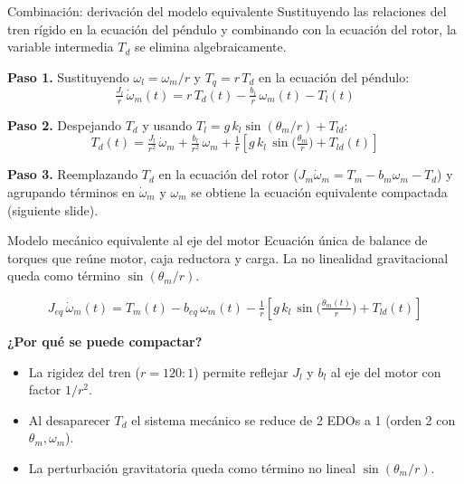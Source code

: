 \documentclass[aspectratio=169,t]{beamer}
\begin{document}
\begin{frame}{Combinación: derivación del modelo equivalente}
{\small\color{uncGray}Sustituyendo las relaciones del tren rígido en la ecuación del péndulo y combinando con la ecuación del rotor, la variable intermedia $T_d$ se elimina algebraicamente.}\par
\vspace{2mm}

\textbf{Paso 1.} Sustituyendo $\omega_l = \omega_m/r$ y $T_q = r\,T_d$ en la ecuación del péndulo:
\begin{equation*}
\tfrac{J_l}{r}\,\dot{\omega}_m(t) = r\,T_d(t) - \tfrac{b_l}{r}\,\omega_m(t) - T_l(t)
\end{equation*}

\textbf{Paso 2.} Despejando $T_d$ y usando $T_l = g\,k_l\sin(\theta_m/r)+T_{ld}$:
\begin{equation*}
T_d(t) = \tfrac{J_l}{r^2}\,\dot{\omega}_m + \tfrac{b_l}{r^2}\,\omega_m + \tfrac{1}{r}\!\left[g\,k_l\,\sin\!\big(\tfrac{\theta_m}{r}\big) + T_{ld}(t)\right]
\end{equation*}

\textbf{Paso 3.} Reemplazando $T_d$ en la ecuación del rotor ($J_m\dot{\omega}_m=T_m-b_m\omega_m-T_d$) y agrupando términos en $\dot{\omega}_m$ y $\omega_m$ se obtiene la ecuación equivalente compactada (siguiente slide).
\end{frame}

\begin{frame}{Modelo mecánico equivalente al eje del motor}
{\small\color{uncGray}Ecuación única de balance de torques que reúne motor, caja reductora y carga. La no linealidad gravitacional queda como término $\sin(\theta_m/r)$.}\par
\vspace{8mm}

\begin{equation*}
\boxed{\;\;
J_{eq}\,\dot{\omega}_m(t) = T_m(t) - b_{eq}\,\omega_m(t) - \tfrac{1}{r}\!\left[g\,k_l\,\sin\!\big(\tfrac{\theta_m(t)}{r}\big) + T_{ld}(t)\right]
\;\;}
\end{equation*}

\vspace{8mm}
\textbf{¿Por qué se puede compactar?}
\begin{itemize}
\item La rigidez del tren ($r=120{:}1$) permite reflejar $J_l$ y $b_l$ al eje del motor con factor $1/r^2$.
\item Al desaparecer $T_d$ el sistema mecánico se reduce de 2 EDOs a 1 (orden 2 con $\theta_m,\omega_m$).
\item La perturbación gravitatoria queda como término no lineal $\sin(\theta_m/r)$.
\end{itemize}
\end{frame}
\end{document}
